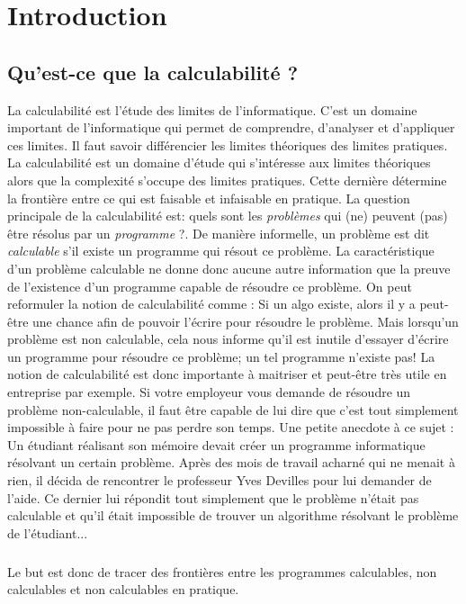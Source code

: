 
\chapter{Introduction}
\label{ch:introduction}

\section{Qu'est-ce que la calculabilité ?}
\label{sec:qu_est-ce_la_calculabilite}

La calculabilité est l'étude des limites de l'informatique. C'est un domaine important de l'informatique qui permet de comprendre, d'analyser et d'appliquer ces limites.
Il faut savoir différencier les limites théoriques des limites
pratiques. La calculabilité est un domaine d'étude qui s'intéresse aux limites théoriques alors que
la complexité s'occupe des limites pratiques. Cette dernière
détermine la frontière entre ce qui est faisable et infaisable en pratique.
La question principale de la calculabilité est: \og quels sont les \textit{problèmes} qui (ne) peuvent (pas)
être résolus par un \textit{programme} ?\fg.  De manière informelle, un problème est dit \emph{calculable} s'il existe un programme qui résout ce problème.  La caractéristique d'un problème calculable ne donne donc aucune
autre information que la preuve de l'existence d'un programme capable de résoudre ce problème. On peut reformuler la notion de calculabilité comme : Si un algo existe, alors il y a peut-être une chance afin de pouvoir l'écrire pour résoudre le problème.  Mais lorsqu'un problème est non calculable, cela nous informe qu'il est inutile d'essayer d'écrire un programme pour résoudre ce problème; un tel programme n'existe pas!
La notion de calculabilité est donc importante à maitriser et peut-être très utile en entreprise par exemple. Si votre employeur vous demande de résoudre un problème non-calculable, il faut être capable de lui dire que c'est tout simplement impossible à faire pour ne pas perdre son temps.
Une petite anecdote à ce sujet : Un étudiant réalisant son mémoire devait créer un programme informatique résolvant un certain problème. Après des mois de travail acharné qui ne menait à rien, il décida de rencontrer le professeur Yves Devilles pour lui demander de l'aide. Ce dernier lui répondit tout simplement que le problème n'était pas calculable et qu'il était impossible de trouver un algorithme résolvant le problème de l'étudiant... 
\paragraph{} Le but est donc de tracer des frontières entre les programmes calculables,
non calculables et non calculables en pratique.

